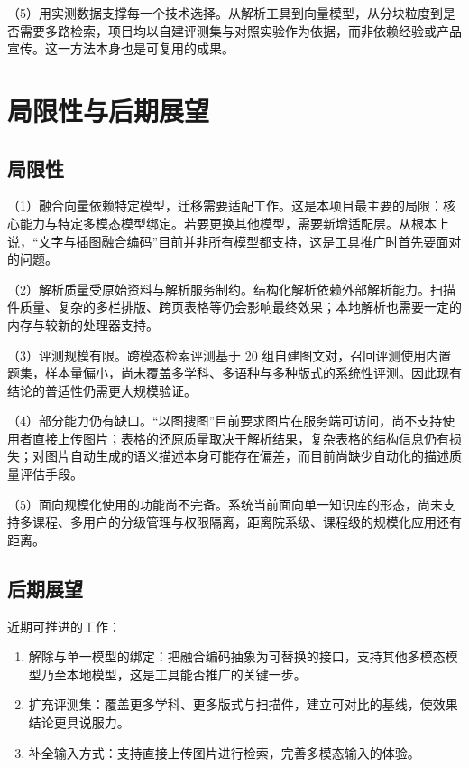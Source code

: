 \documentclass[12pt,a4paper]{ctexart}
\begin{document}
（5）用实测数据支撑每一个技术选择。从解析工具到向量模型，从分块粒度到是否需要多路检索，项目均以自建评测集与对照实验作为依据，而非依赖经验或产品宣传。这一方法本身也是可复用的成果。

\section{局限性与后期展望}

\subsection{局限性}

（1）融合向量依赖特定模型，迁移需要适配工作。这是本项目最主要的局限：核心能力与特定多模态模型绑定。若要更换其他模型，需要新增适配层。从根本上说，“文字与插图融合编码”目前并非所有模型都支持，这是工具推广时首先要面对的问题。

（2）解析质量受原始资料与解析服务制约。结构化解析依赖外部解析能力。扫描件质量、复杂的多栏排版、跨页表格等仍会影响最终效果；本地解析也需要一定的内存与较新的处理器支持。

（3）评测规模有限。跨模态检索评测基于 20 组自建图文对，召回评测使用内置题集，样本量偏小，尚未覆盖多学科、多语种与多种版式的系统性评测。因此现有结论的普适性仍需更大规模验证。

（4）部分能力仍有缺口。“以图搜图”目前要求图片在服务端可访问，尚不支持使用者直接上传图片；表格的还原质量取决于解析结果，复杂表格的结构信息仍有损失；对图片自动生成的语义描述本身可能存在偏差，而目前尚缺少自动化的描述质量评估手段。

（5）面向规模化使用的功能尚不完备。系统当前面向单一知识库的形态，尚未支持多课程、多用户的分级管理与权限隔离，距离院系级、课程级的规模化应用还有距离。

\subsection{后期展望}

近期可推进的工作：

\begin{enumerate}[leftmargin=2.4em,itemsep=3pt]
  \item 解除与单一模型的绑定：把融合编码抽象为可替换的接口，支持其他多模态模型乃至本地模型，这是工具能否推广的关键一步。
  \item 扩充评测集：覆盖更多学科、更多版式与扫描件，建立可对比的基线，使效果结论更具说服力。
  \item 补全输入方式：支持直接上传图片进行检索，完善多模态输入的体验。
\end{enumerate}
\end{document}
